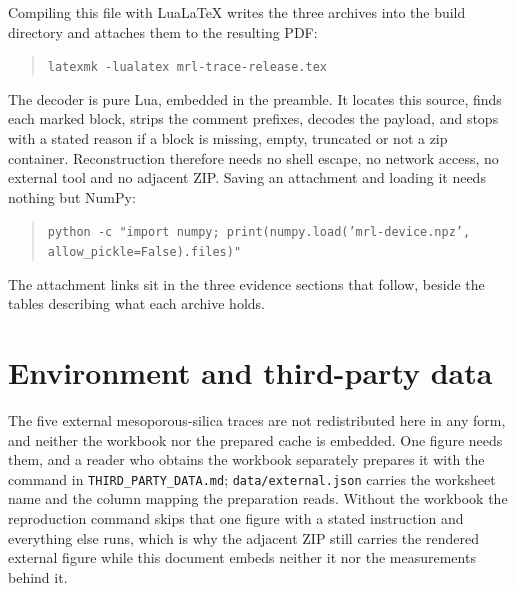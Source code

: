 \documentclass[a4paper,10pt]{article}
\begin{document}
Compiling this file with LuaLaTeX writes the three archives into the build directory and
attaches them to the resulting PDF:
\begin{quote}
\texttt{latexmk -lualatex mrl-trace-release.tex}
\end{quote}
The decoder is pure Lua, embedded in the preamble. It locates this source, finds each marked
block, strips the comment prefixes, decodes the payload, and stops with a stated reason if a
block is missing, empty, truncated or not a zip container. Reconstruction therefore needs no
shell escape, no network access, no external tool and no adjacent ZIP. Saving an attachment
and loading it needs nothing but NumPy:
\begin{quote}
\texttt{python -c "import numpy; print(numpy.load('mrl-device.npz',
allow\_pickle=False).files)"}
\end{quote}
The attachment links sit in the three evidence sections that follow, beside the tables
describing what each archive holds.
\clearpage
\tableofcontents
\clearpage
\section{Environment and third-party data}
The five external mesoporous-silica traces are not redistributed here in any form,
and neither the workbook nor the prepared cache is embedded. One figure needs them, and a
reader who obtains the workbook separately prepares it with the command in
\texttt{THIRD\_PARTY\_DATA.md}; \texttt{data/external.json} carries the worksheet name and the
column mapping the preparation reads. Without the workbook the reproduction command skips that
one figure with a stated instruction and everything else runs, which is why the adjacent ZIP
still carries the rendered external figure while this document embeds neither it nor the
measurements behind it.
\end{document}
